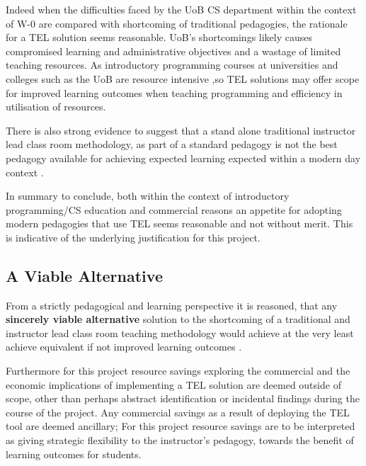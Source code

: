 Indeed when the difficulties faced by the UoB CS department within the context of W-0 are compared with shortcoming of traditional pedagogies, the rationale for a TEL solution seems reasonable. UoB's shortcomings likely causes compromised learning and administrative objectives and a wastage of limited teaching resources. As introductory programming courses at universities and colleges such as the UoB are resource intensive \cite{Chigona2008},so TEL solutions may offer scope for improved learning outcomes when teaching programming \cite{Ibanez2014,Bittencourt2015,Serrano-Laguna2015} and efficiency in utilisation of resources.



There is also strong evidence to suggest that a stand alone traditional instructor lead class room methodology, as part of a standard pedagogy is not the best pedagogy available for achieving expected learning expected within a modern day context \cite{Means2009,RickReis,Burge2011,Gordon2014,Chigona2008,Team2008}. 

In summary to conclude, both within the context of introductory programming/CS education and commercial reasons an appetite for adopting modern pedagogies that use TEL seems reasonable and not without merit. This is indicative of the underlying justification for this project.


\label{sec:sec01}
\subsection{A Viable Alternative}
\label{subsec:subsec01}

From a strictly pedagogical and learning perspective it is reasoned, that any \textbf{sincerely viable alternative} solution to the shortcoming of a traditional and instructor lead class room teaching methodology would achieve at the very least achieve equivalent if not improved learning outcomes \cite{RickReis,Means2009}. 

Furthermore for this project resource savings exploring the commercial and the economic implications of implementing a TEL solution are deemed outside of scope, other than perhaps abstract identification or incidental findings during the course of the project. Any commercial savings as a result of deploying the TEL tool are  deemed ancillary; For this project resource savings are to be interpreted as giving strategic flexibility to the instructor's pedagogy, towards the benefit of learning outcomes for students.



